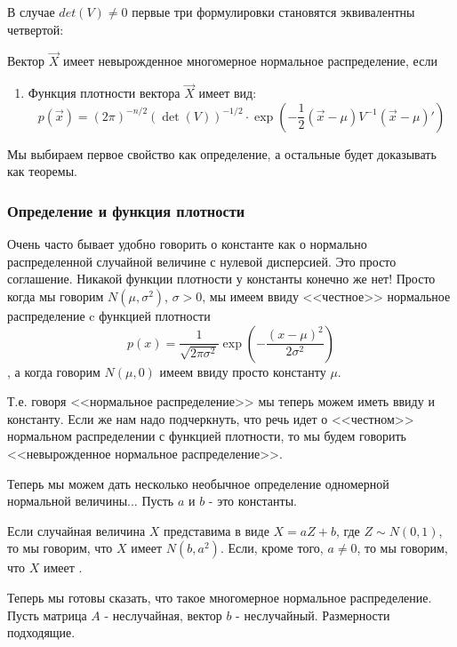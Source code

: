 В случае $det(V)\neq 0$ первые три формулировки становятся эквивалентны четвертой:

Вектор $\vec{X}$ имеет невырожденное многомерное нормальное распределение, если
\begin{enumerate}
\item Функция плотности вектора $\vec{X}$ имеет вид:
\begin{equation}
p(\vec{x})=(2\pi)^{-n/2}(\det(V))^{-1/2}\cdot \exp\left(-\frac{1}{2}(\vec{x}-\mu) V^{-1} (\vec{x}-\mu)' \right) 
\end{equation}
\end{enumerate}

Мы выбираем первое свойство как определение, а остальные будет доказывать как теоремы.


\subsubsection*{Определение и функция плотности}


Очень часто бывает удобно говорить о константе как о нормально распределенной случайной величине с нулевой дисперсией. Это просто соглашение. Никакой функции плотности у константы конечно же нет! Просто когда мы говорим $N(\mu,\sigma^{2})$, $\sigma>0$, мы имеем ввиду <<честное>> нормальное распределение c функцией плотности
\begin{equation}
p(x)=\frac{1}{\sqrt{2\pi\sigma^{2}}}\exp\left(-\frac{(x-\mu)^{2}}{2\sigma^{2}}\right)
\end{equation}
, а когда говорим $N(\mu,0)$ имеем ввиду просто константу $\mu$.

Т.е. говоря <<нормальное распределение>> мы теперь можем иметь ввиду и константу. Если же нам надо подчеркнуть, что речь идет о <<честном>> нормальном распределении с функцией плотности, то мы будем говорить <<невырожденное нормальное распределение>>.


Теперь мы можем дать несколько необычное определение одномерной нормальной величины... Пусть $a$ и $b$ - это константы.

\begin{mydef}
Если случайная величина $X$ представима в виде $X=aZ+b$, где $Z\sim N(0,1)$, то мы говорим, что $X$ имеет  $N(b,a^{2})$. Если, кроме того, $a\neq 0$, то мы говорим, что $X$ имеет .
\end{mydef}


Теперь мы готовы сказать, что такое многомерное нормальное распределение. Пусть матрица $A$ - неслучайная, вектор $b$ - неслучайный. Размерности подходящие.

